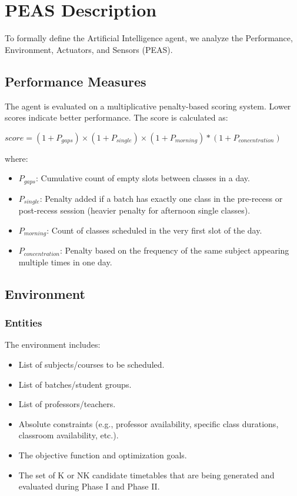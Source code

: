 \documentclass[a4paper,twoside,11pt]{article}
\begin{document}
    \section{PEAS Description}
        To formally define the Artificial Intelligence agent, we analyze the Performance, Environment, Actuators, and Sensors (PEAS).

        \subsection{Performance Measures}
            The agent is evaluated on a multiplicative penalty-based scoring system. Lower scores indicate better performance. The score is calculated as:

            \begin{center}
                $score = (1 + P_{gaps}) \times (1 + P_{single}) \times (1 + P_{morning}) * (1 + P_{concentration})$
            \end{center}

            where:
            \begin{itemize}
                \item $P_{gaps}$: Cumulative count of empty slots between classes in a day.
                \item $P_{single}$: Penalty added if a batch has exactly one class in the pre-recess or post-recess session (heavier penalty for afternoon single classes).
                \item $P_{morning}$: Count of classes scheduled in the very first slot of the day.
                \item $P_{concentration}$: Penalty based on the frequency of the same subject appearing multiple times in one day.
            \end{itemize}

        \subsection{Environment}


            \subsubsection{Entities}
                The environment includes:
                \begin{itemize}
                    \itemsep0em
                    \item List of subjects/courses to be scheduled.
                    \item List of batches/student groups.
                    \item List of professors/teachers.
                    \item Absolute constraints (e.g., professor availability, specific class durations, classroom availability, etc.).
                    \item The objective function and optimization goals.
                    \item The set of K or NK candidate timetables that are being generated and evaluated during Phase I and Phase II.
                \end{itemize}
\end{document}

